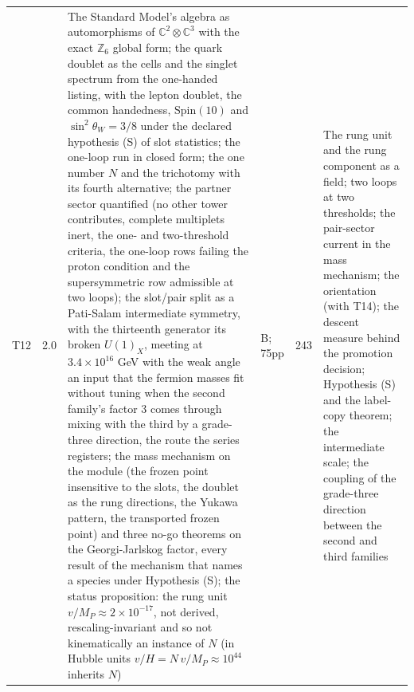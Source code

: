 \documentclass[11pt]{article}
\theoremstyle{definition}
\theoremstyle{plain}
\providecommand{\C}{}\renewcommand{\C}{\mathbb{C}}
\providecommand{\Z}{}\renewcommand{\Z}{\mathbb{Z}}
\begin{document}
\begin{longtable}{p{} p{} p{} p{} p{} p{}}
T12 & 2.0 & The Standard Model's algebra as automorphisms of $\C^{2}\otimes\C^{3}$ with the exact $\Z_{6}$ global form; the quark doublet as the cells and the singlet spectrum from the one-handed listing, with the lepton doublet, the common handedness, $\mathrm{Spin}(10)$ and $\sin^{2}\theta_{W} = 3/8$ under the declared hypothesis (S) of slot statistics; the one-loop run in closed form; the one number $N$ and the trichotomy with its fourth alternative; the partner sector quantified (no other tower contributes, complete multiplets inert, the one- and two-threshold criteria, the one-loop rows failing the proton condition and the supersymmetric row admissible at two loops); the slot/pair split as a Pati-Salam intermediate symmetry, with the thirteenth generator its broken $U(1)_{X}$, meeting at $3.4 \times 10^{16}$ GeV with the weak angle an input that the fermion masses fit without tuning when the second family's factor $3$ comes through mixing with the third by a grade-three direction, the route the series registers; the mass mechanism on the module (the frozen point insensitive to the slots, the doublet as the rung directions, the Yukawa pattern, the transported frozen point) and three no-go theorems on the Georgi-Jarlskog factor, every result of the mechanism that names a species under Hypothesis (S); the status proposition: the rung unit $v/M_{P} \approx 2 \times 10^{-17}$, not derived, rescaling-invariant and so not kinematically an instance of $N$ (in Hubble units $v/H = N\,v/M_{P} \approx 10^{44}$ inherits $N$) \cite{ButlerT12} & B; 75pp & 243 & The rung unit and the rung component as a field; two loops at two thresholds; the pair-sector current in the mass mechanism; the orientation (with T14); the descent measure behind the promotion decision; Hypothesis (S) and the label-copy theorem; the intermediate scale; the coupling of the grade-three direction between the second and third families \\

\end{longtable}
\end{document}
